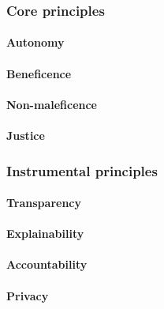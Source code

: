 
\subsubsection{Core principles}

\paragraph{Autonomy}

\paragraph{Beneficence}

\paragraph{Non-maleficence}

\paragraph{Justice}


\subsubsection{Instrumental principles}

\paragraph{Transparency}

\paragraph{Explainability}

\paragraph{Accountability}

\paragraph{Privacy}

